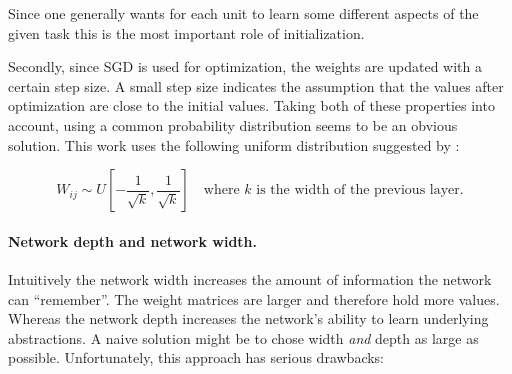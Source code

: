 Since one generally wants for each unit to learn some different aspects of the given task this is the most important role of initialization. 

Secondly, since SGD is used for optimization, the weights are updated with a certain step size. A small step size indicates the assumption that the values after optimization are close to the initial values. Taking both of these properties into account, using a common probability distribution seems to be an obvious solution. This work uses the following uniform distribution suggested by \cite{pmlr-v9-glorot10a}:

\begin{equation}
	\label{eq:glorot-initialization}
	W_{ij} \sim U\left[ -\frac{1}{\sqrt{k}}, \frac{1}{\sqrt{k}} \right]
	\quad \text{where $k$ is the width of the previous layer.} 
\end{equation}


\paragraph{Network depth and network width.}
Intuitively the network width increases the amount of information the network can ``remember''. The weight matrices are larger and therefore hold more values. Whereas the network depth increases the network's ability to learn underlying abstractions. A naive solution might be to chose width \emph{and} depth as large as possible. Unfortunately, this approach has serious drawbacks:


